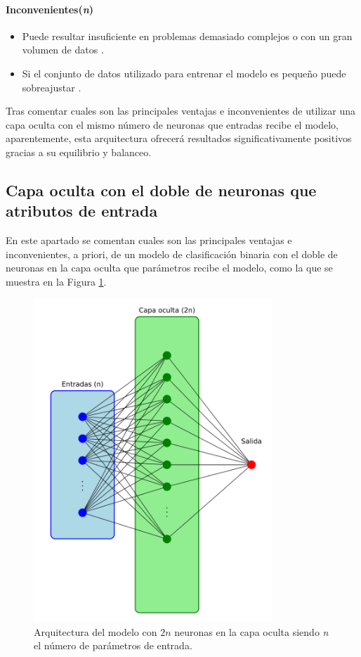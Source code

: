 \paragraph{Inconvenientes(\textit{n})}
\begin{itemize}
	\item Puede resultar insuficiente en problemas demasiado complejos o con un gran volumen de datos \cite{hochreiter1997long}.
	\item Si el conjunto de datos utilizado para entrenar el modelo es pequeño puede sobreajustar \cite{yamada2018understanding}.
\end{itemize}

Tras comentar cuales son las principales ventajas e inconvenientes de utilizar una capa oculta con el mismo número de neuronas que entradas recibe el modelo, aparentemente, esta arquitectura ofrecerá resultados significativamente positivos gracias a su equilibrio y balanceo.

\subsection{Capa oculta con el doble de neuronas que atributos de entrada}\label{sec:VIBIN98}
En este apartado se comentan cuales son las principales ventajas e inconvenientes, a priori, de un modelo de clasificación binaria con el doble de neuronas en la capa oculta que parámetros recibe el modelo, como la que se muestra en la Figura \ref{fig:arqnnBIN}.

\begin{figure}[H]
    \centering
    \includegraphics[width=0.8\textwidth]{./img/modelo/arquitecturas/arqnnBIN.pdf}
    \caption{Arquitectura del modelo con $2n$ neuronas en la capa oculta siendo \textit{n} el número de parámetros de entrada.}
    \label{fig:arqnnBIN}
\end{figure}

